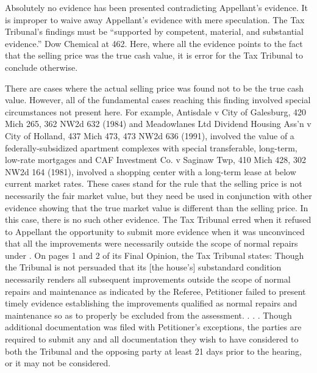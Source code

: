 Absolutely no evidence has been presented contradicting Appellant's evidence. It is improper to waive away Appellant's evidence with mere speculation. The Tax Tribunal's findings must be ``supported by competent, material, and substantial evidence.'' Dow Chemical at 462. Here, where all the evidence points to the fact that the selling price was the true cash value, it is error for the Tax Tribunal to conclude otherwise.

There are cases where the actual selling price was found not to be the true cash value. However, all of the fundamental cases reaching this finding involved special circumstances not present here. For example, Antisdale v City of Galesburg, 420 Mich 265, 362 NW2d 632 (1984) and Meadowlanes Ltd Dividend Housing Ass'n v City of Holland, 437 Mich 473, 473 NW2d 636 (1991), involved the value of a federally-subsidized apartment complexes with special transferable, long-term, low-rate mortgages and CAF Investment Co. v Saginaw Twp, 410 Mich 428, 302 NW2d 164 (1981), involved a shopping center with a long-term lease at below current market rates. These cases stand for the rule that the selling price is not necessarily the fair market value, but they need be used in conjunction with other evidence showing that the true market value is different than the selling price. In this case, there is no such other evidence.
The Tax Tribunal erred when it refused to Appellant the opportunity to submit more evidence when it was unconvinced that all the improvements were necessarily outside the scope of normal repairs under .
On pages 1 and 2 of its Final Opinion, the Tax Tribunal states: 
Though the Tribunal is not persuaded that its [the house's] substandard condition necessarily renders all subsequent improvements outside the scope of normal repairs and maintenance as indicated by the Referee, Petitioner failed to present timely evidence establishing the improvements qualified as normal repairs and maintenance so as to properly be excluded from the assessment. . . . Though additional documentation was filed with Petitioner's exceptions, the parties are required to submit any and all documentation they wish to have considered to both the Tribunal and the opposing party at least 21 days prior to the hearing, or it may not be considered.
 
